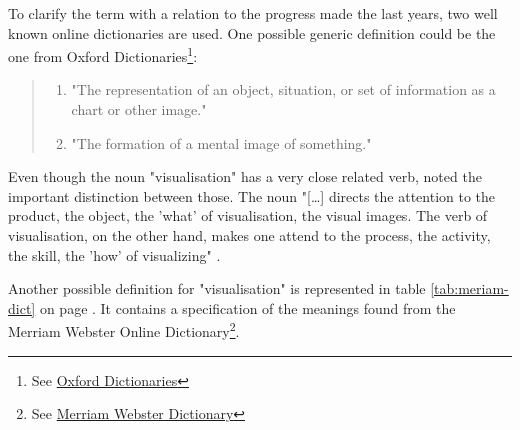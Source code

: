 To clarify the term with a relation to the progress made the last years, two well known online dictionaries are used. One possible generic definition could be the one from Oxford Dictionaries\footnote{See \href{https://www.oxforddictionaries.com/definition/english/visualisation}{Oxford Dictionaries}}:

\begin{quote}
\begin{enumerate}
\item "The representation of an object, situation, or set of information as a chart or other image."
\item "The formation of a mental image of something."
\end{enumerate}
\end{quote}

Even though the noun "visualisation" has a very close related verb, \citeauthor{Phillips2010} noted the important distinction between those. The noun "[\ldots] directs the attention to the product, the object, the 'what' of visualisation, the visual images. The verb of visualisation, on the other hand, makes one attend to the process, the activity, the skill, the 'how' of visualizing" .

Another possible definition for "visualisation" is represented in table \ref{tab:meriam-dict} on page \pageref{tab:meriam-dict}. It contains a specification of the meanings found from the Merriam Webster Online Dictionary\footnote{\label{mod}See \href{http://www.merriam-webster.com/}{Merriam Webster Dictionary}}.

